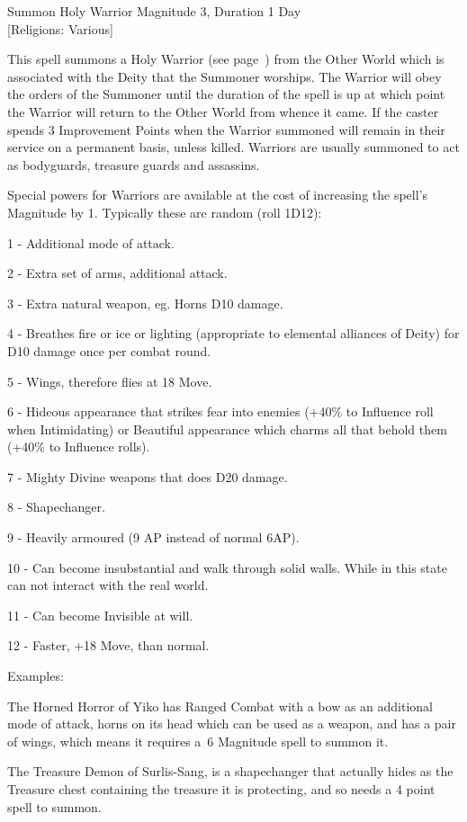 \begin{rpg-spell}
{Summon Holy Warrior}
{Magnitude 3, Duration 1 Day\\{[Religions: Various]}}

This spell summons a Holy Warrior (see page~\pageref{monster:holy-warrior}) from the Other World which is associated with the Deity that the Summoner worships. The Warrior will obey the orders of the Summoner until the duration of the spell is up at which point the Warrior will return to the Other World from whence it came. If the caster spends 3 Improvement Points when the Warrior summoned will remain in their service on a permanent basis, unless killed. Warriors are usually summoned to act as bodyguards, treasure guards and assassins.

Special powers for Warriors are available at the cost of increasing the spell’s Magnitude by 1. Typically these are random (roll 1D12):
\begin{rpg-list}
\item 1 - Additional mode of attack.
\item 2 - Extra set of arms, additional attack.
\item 3 - Extra natural weapon, eg. Horns D10 damage.
\item 4 - Breathes fire or ice or lighting (appropriate to elemental alliances of Deity) for D10 damage once per combat round.
\item 5 - Wings, therefore flies at 18 Move.
\item 6 - Hideous appearance that strikes fear into enemies (+40\% to Influence roll when Intimidating) or Beautiful appearance which charms all that behold them (+40\% to Influence rolls).
\item 7 - Mighty Divine weapons that does D20 damage.
\item 8 - Shapechanger.
\item 9 - Heavily armoured (9 AP instead of normal 6AP).
\item 10 - Can become insubstantial and walk through solid walls. While in this state can not interact with the real world.
\item 11 - Can become Invisible at will.
\item 12 - Faster, +18 Move, than normal.
\end{rpg-list}

Examples:

The Horned Horror of Yiko has Ranged Combat with a bow as an additional mode of attack, horns on its head which can be used as a weapon, and has a pair of wings, which means it requires a 6 Magnitude spell to summon it.

The Treasure Demon of Surlis-Sang, is a shapechanger that actually hides as the Treasure chest containing the treasure it is protecting, and so needs a 4 point spell to summon.
\end{rpg-spell}

